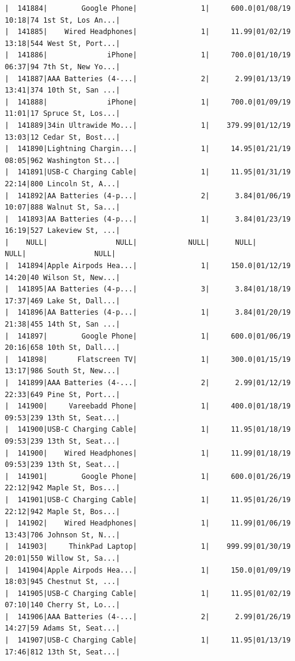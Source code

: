 \documentclass[
  letterpaper,
  DIV=11,
  numbers=noendperiod]{scrartcl}
\begin{document}
\begin{verbatim}
|  141884|        Google Phone|               1|     600.0|01/08/19 10:18|74 1st St, Los An...|
|  141885|    Wired Headphones|               1|     11.99|01/02/19 13:18|544 West St, Port...|
|  141886|              iPhone|               1|     700.0|01/10/19 06:37|94 7th St, New Yo...|
|  141887|AAA Batteries (4-...|               2|      2.99|01/13/19 13:41|374 10th St, San ...|
|  141888|              iPhone|               1|     700.0|01/09/19 11:01|17 Spruce St, Los...|
|  141889|34in Ultrawide Mo...|               1|    379.99|01/12/19 13:03|12 Cedar St, Bost...|
|  141890|Lightning Chargin...|               1|     14.95|01/21/19 08:05|962 Washington St...|
|  141891|USB-C Charging Cable|               1|     11.95|01/31/19 22:14|800 Lincoln St, A...|
|  141892|AA Batteries (4-p...|               2|      3.84|01/06/19 10:07|888 Walnut St, Sa...|
|  141893|AA Batteries (4-p...|               1|      3.84|01/23/19 16:19|527 Lakeview St, ...|
|    NULL|                NULL|            NULL|      NULL|          NULL|                NULL|
|  141894|Apple Airpods Hea...|               1|     150.0|01/12/19 14:20|40 Wilson St, New...|
|  141895|AA Batteries (4-p...|               3|      3.84|01/18/19 17:37|469 Lake St, Dall...|
|  141896|AA Batteries (4-p...|               1|      3.84|01/20/19 21:38|455 14th St, San ...|
|  141897|        Google Phone|               1|     600.0|01/06/19 20:16|658 10th St, Dall...|
|  141898|       Flatscreen TV|               1|     300.0|01/15/19 13:17|986 South St, New...|
|  141899|AAA Batteries (4-...|               2|      2.99|01/12/19 22:33|649 Pine St, Port...|
|  141900|     Vareebadd Phone|               1|     400.0|01/18/19 09:53|239 13th St, Seat...|
|  141900|USB-C Charging Cable|               1|     11.95|01/18/19 09:53|239 13th St, Seat...|
|  141900|    Wired Headphones|               1|     11.99|01/18/19 09:53|239 13th St, Seat...|
|  141901|        Google Phone|               1|     600.0|01/26/19 22:12|942 Maple St, Bos...|
|  141901|USB-C Charging Cable|               1|     11.95|01/26/19 22:12|942 Maple St, Bos...|
|  141902|    Wired Headphones|               1|     11.99|01/06/19 13:43|706 Johnson St, N...|
|  141903|     ThinkPad Laptop|               1|    999.99|01/30/19 20:01|550 Willow St, Sa...|
|  141904|Apple Airpods Hea...|               1|     150.0|01/09/19 18:03|945 Chestnut St, ...|
|  141905|USB-C Charging Cable|               1|     11.95|01/02/19 07:10|140 Cherry St, Lo...|
|  141906|AAA Batteries (4-...|               2|      2.99|01/26/19 14:27|59 Adams St, Seat...|
|  141907|USB-C Charging Cable|               1|     11.95|01/13/19 17:46|812 13th St, Seat...|

\end{verbatim}
\end{document}
